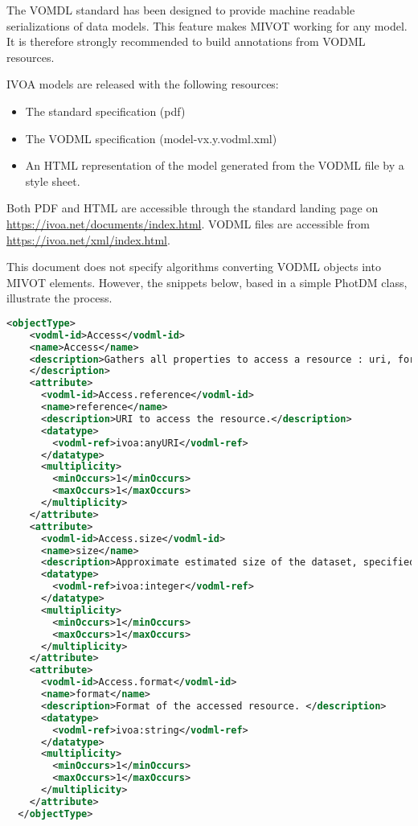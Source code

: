The VOMDL standard has been designed to provide machine readable serializations of data models. 
This feature makes MIVOT working for any model.
It is therefore strongly recommended to build annotations from VODML resources.

IVOA models are released with the following resources:
\begin{itemize}
    \item The standard specification (pdf)
    \item The VODML specification (model-vx.y.vodml.xml)
    \item An HTML representation of the model generated from the VODML file by a style sheet.    
\end{itemize}

Both PDF and HTML are accessible through the standard landing page
on \url{https://ivoa.net/documents/index.html}.
VODML files are accessible from \url{https://ivoa.net/xml/index.html}.

This document does not specify algorithms converting VODML objects 
into MIVOT elements. However, the snippets below, based in a simple PhotDM class,
illustrate the process.

\begin{lstlisting}[caption={VODML representation of the PhotDM class \texttt{Access}.
This is an object type with 3 attributes, each one with a cardinality equal  to 1. 
At this stage, we do not know whether attributes are typed with a complex types 
or primitive types. This will come later on by going through their own VODML definitions.},language=XML]
  <objectType>
    <vodml-id>Access</vodml-id>
    <name>Access</name>
    <description>Gathers all properties to access a resource : uri, format and size . 
    </description>
    <attribute>
      <vodml-id>Access.reference</vodml-id>
      <name>reference</name>
      <description>URI to access the resource.</description>
      <datatype>
        <vodml-ref>ivoa:anyURI</vodml-ref>
      </datatype>
      <multiplicity>
        <minOccurs>1</minOccurs>
        <maxOccurs>1</maxOccurs>
      </multiplicity>
    </attribute>
    <attribute>
      <vodml-id>Access.size</vodml-id>
      <name>size</name>
      <description>Approximate estimated size of the dataset, specified in kilobytes.</description>
      <datatype>
        <vodml-ref>ivoa:integer</vodml-ref>
      </datatype>
      <multiplicity>
        <minOccurs>1</minOccurs>
        <maxOccurs>1</maxOccurs>
      </multiplicity>
    </attribute>
    <attribute>
      <vodml-id>Access.format</vodml-id>
      <name>format</name>
      <description>Format of the accessed resource. </description>
      <datatype>
        <vodml-ref>ivoa:string</vodml-ref>
      </datatype>
      <multiplicity>
        <minOccurs>1</minOccurs>
        <maxOccurs>1</maxOccurs>
      </multiplicity>
    </attribute>
  </objectType>
\end{lstlisting}  

